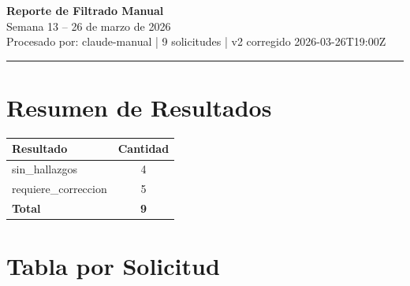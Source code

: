 \documentclass[11pt,a4paper]{article}
\begin{document}
\begin{center}
  {\LARGE \textbf{Reporte de Filtrado Manual}}\\[0.4em]
  {\large Semana 13 -- 26 de marzo de 2026}\\[0.2em]
  {\small\color{gris} Procesado por: claude-manual | 9 solicitudes | v2 corregido 2026-03-26T19:00Z}
\end{center}

\vspace{0.5em}
\hrule
\vspace{0.8em}

\section{Resumen de Resultados}

\begin{center}
\begin{tabular}{@{}lc@{}}
\toprule
\textbf{Resultado} & \textbf{Cantidad} \\
\midrule
sin\_hallazgos & 4 \\
requiere\_correccion & 5 \\
\midrule
\textbf{Total} & \textbf{9} \\
\bottomrule
\end{tabular}
\end{center}

\vspace{0.8em}

\section{Tabla por Solicitud}
\end{document}
